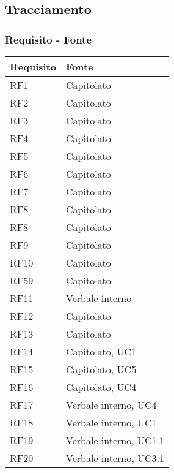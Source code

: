 \subsection{Tracciamento}

\subsubsection{Requisito - Fonte}

\begin{center}
    \begin{longtable}{|C{5cm}|C{5cm}|}
        \hline
        \textbf{Requisito} & \textbf{Fonte} \\
        \hline
        RF1 & Capitolato \\
        \hline
        RF2 & Capitolato \\
        \hline
        RF3 & Capitolato \\
        \hline
        RF4 & Capitolato \\
        \hline
        RF5 & Capitolato \\
        \hline
        RF6 & Capitolato \\
        \hline
        RF7 & Capitolato \\
        \hline
        RF8 & Capitolato \\
        \hline
        RF8 & Capitolato \\
        \hline
        RF9 & Capitolato \\
        \hline
        RF10 & Capitolato \\
        \hline
        RF59 & Capitolato \\
        \hline
        RF11 & Verbale interno \\
        \hline
        RF12 & Capitolato \\
        \hline
        RF13 & Capitolato \\
        \hline
        RF14 & Capitolato, UC1 \\
        \hline
        RF15 & Capitolato, UC5 \\
        \hline
        RF16 & Capitolato, UC4 \\
        \hline
        RF17 & Verbale interno, UC4 \\
        \hline
        RF18 & Verbale interno, UC1 \\
        \hline
        RF19 & Verbale interno, UC1.1 \\
        \hline
        RF20 & Verbale interno, UC3.1 \\

\end{longtable}
\end{center}

